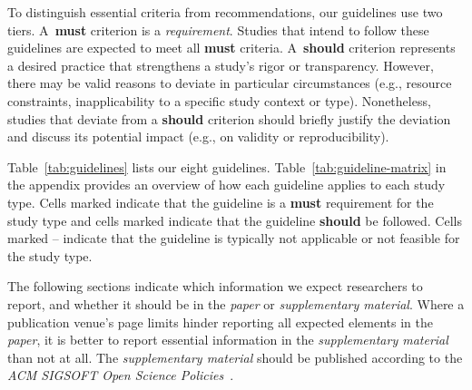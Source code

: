 \documentclass[smallextended]{svjour3}
\newif\ifpaper\papertrue
\newcommand{\must}{\textbf{must}\xspace}
\newcommand{\should}{\textbf{should}\xspace}
\newcommand{\paper}{\emph{paper}\xspace}
\newcommand{\supplementarymaterial}{\emph{supplementary material}\xspace}
\newcommand{\paper}{\emph{paper}\xspace}
\newcommand{\supplementarymaterial}{\emph{supplementary material}\xspace}
\newcommand{\iconM}{\usebox{\iconMbox}\xspace}
\newcommand{\iconS}{\usebox{\iconSbox}\xspace}
\newcommand{\iconM}{●\xspace}
\newcommand{\iconS}{○\xspace}
\begin{document}
To distinguish essential criteria from recommendations, our guidelines use two tiers.
A~\must criterion is a \emph{requirement}. Studies that intend to follow these
guidelines are expected to meet all \must criteria.
A~\should criterion represents a desired practice that strengthens a study's rigor or transparency.
However, there may be valid reasons to deviate in particular circumstances (e.g., resource constraints, inapplicability to a specific study context or type).
Nonetheless, studies that deviate from a \should criterion should briefly justify the
deviation and discuss its potential impact (e.g., on validity or reproducibility).
\ifpaper
Table~\ref{tab:guidelines} lists our eight guidelines.
Table~\ref{tab:guideline-matrix} in the appendix provides an overview of how each guideline applies to each study type.
Cells marked \iconM indicate that the guideline is a \must requirement for the study type and cells marked \iconS indicate that the guideline \should be followed.
Cells marked -- indicate that the guideline is typically not applicable or not feasible for the study type.
\fi

The following sections indicate which information we expect researchers to report, and whether it should be in the \paper or \supplementarymaterial. Where a publication venue's page limits hinder reporting all expected elements in the \paper, it is better to report essential information in the \supplementarymaterial than not at all.
The \supplementarymaterial should be published according to the \emph{ACM SIGSOFT Open Science Policies}~\citep{daniel_graziotin_2024_10796477}.
 
\end{document}
